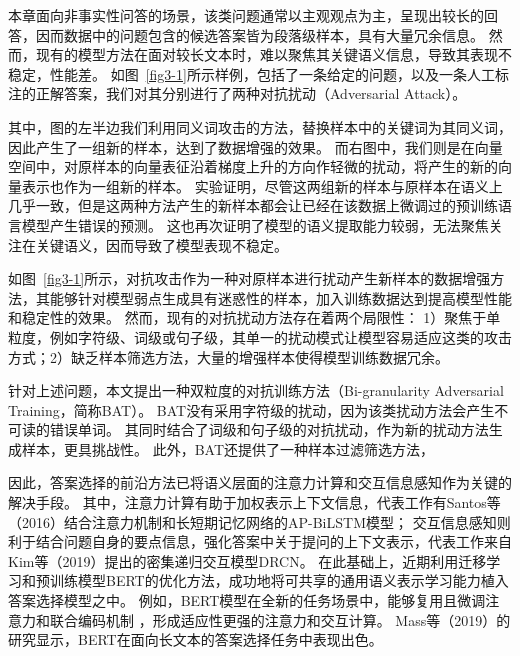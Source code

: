 本章面向非事实性问答的场景，该类问题通常以主观观点为主，呈现出较长的回答，因而数据中的问题包含的候选答案皆为段落级样本，具有大量冗余信息。
然而，现有的模型方法在面对较长文本时，难以聚焦其关键语义信息，导致其表现不稳定，性能差。
如图~\ref{fig3-1}所示样例，包括了一条给定的问题，以及一条人工标注的正解答案，我们对其分别进行了两种对抗扰动（Adversarial Attack）。



其中，图的左半边我们利用同义词攻击的方法，替换样本中的关键词为其同义词，因此产生了一组新的样本，达到了数据增强的效果。
而右图中，我们则是在向量空间中，对原样本的向量表征沿着梯度上升的方向作轻微的扰动，将产生的新的向量表示也作为一组新的样本。
实验证明，尽管这两组新的样本与原样本在语义上几乎一致，但是这两种方法产生的新样本都会让已经在该数据上微调过的预训练语言模型产生错误的预测。
这也再次证明了模型的语义提取能力较弱，无法聚焦关注在关键语义，因而导致了模型表现不稳定。

如图~\ref{fig3-1}所示，对抗攻击作为一种对原样本进行扰动产生新样本的数据增强方法，其能够针对模型弱点生成具有迷惑性的样本，加入训练数据达到提高模型性能和稳定性的效果。
然而，现有的对抗扰动方法存在着两个局限性：
1）聚焦于单粒度，例如字符级、词级或句子级，其单一的扰动模式让模型容易适应这类的攻击方式；2）缺乏样本筛选方法，大量的增强样本使得模型训练数据冗余。

针对上述问题，本文提出一种双粒度的对抗训练方法（Bi-granularity Adversarial Training，简称BAT）。
BAT没有采用字符级的扰动，因为该类扰动方法会产生不可读的错误单词。
其同时结合了词级和句子级的对抗扰动，作为新的扰动方法生成样本，更具挑战性。
此外，BAT还提供了一种样本过滤筛选方法，












因此，答案选择的前沿方法已将语义层面的注意力计算和交互信息感知作为关键的解决手段。
其中，注意力计算有助于加权表示上下文信息，代表工作有Santos等（2016）\cite{santos2016attentive}结合注意力机制和长短期记忆网络的AP-BiLSTM模型；
交互信息感知则利于结合问题自身的要点信息，强化答案中关于提问的上下文表示，代表工作来自Kim等（2019）\cite{kim2019semantic}提出的密集递归交互模型DRCN。
在此基础上，近期利用迁移学习和预训练模型BERT的优化方法，成功地将可共享的通用语义表示学习能力植入答案选择模型之中。
例如，BERT\cite{devlin2018bert}模型在全新的任务场景中，能够复用且微调注意力和联合编码机制
，形成适应性更强的注意力和交互计算。
Mass等（2019）\cite{mass2019study}的研究显示，BERT在面向长文本的答案选择任务中表现出色。

